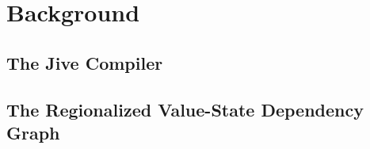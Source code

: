 
\section{Background}

\subsection{The Jive Compiler}
\label{background:jive}


\subsection{The Regionalized Value-State Dependency Graph}
\label{background:RVSDG}


